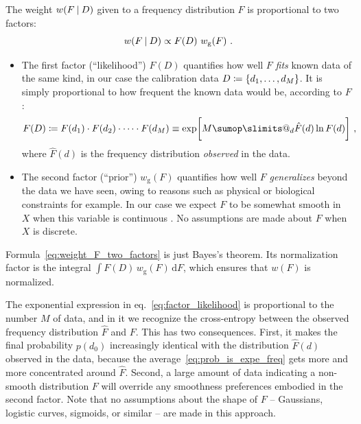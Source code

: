\documentclass[\ifafour a4paper,12pt,\else a5paper,10pt,\fi%
onecolumn,oneside,article,%
british%
]{memoir}
\makeatletter
\theoremstyle{remark}
\theoremstyle{innote}
\def\sum{\DOTSI\sumop\slimits@}
\newcommand*{\wrench}{{\fontencoding{U}\fontfamily{fontawesomethree}\selectfont\symbol{114}}}
\newcommand{\mynotew}[1]{{\footnotesize\color{notecolour}\wrench\ #1}}
\newcommand*{\di}{\mathrm{d}}%
\newcommand*{\defd}{\coloneqq}
\DeclarePairedDelimiter\set{\{}{\}} %
\renewcommand*{\|}[1][]{\nonscript\:#1\vert\nonscript\:\mathopen{}}
\newcommand*{\eqn}{eq.}%
\newcommand*{\wf}{w}
\newcommand*{\wfo}{w_{\textrm{g}}}
\makeatother
\begin{document}
The weight $\wf(F \| D)$ given to a frequency distribution $F$ is proportional to two factors:
\begin{equation}
  \label{eq:weight_F_two_factors}
  \wf(F \| D) \propto F(D)\ \wfo(F) \ .
\end{equation}
\begin{itemize}
  \item The first factor (\enquote{likelihood}) $F(D)$ quantifies how well $F$ \emph{fits} known data of the same kind, in our case the calibration data $D \defd \set{d_{1}, \dotsc, d_{M}}$. It is simply proportional to how frequent the known data would be, according to $F$:
  \begin{equation}
    \label{eq:factor_likelihood}
    F(D) \defd F(d_{1})\cdot F(d_{2})\cdot \dotsm\cdot F(d_{M})
    \equiv \exp\biggl[M \sum_{d} \hat{F}(d) \ln F(d)\biggr] \ ,
  \end{equation}
where $\hat{F}(d)$ is the frequency distribution \emph{observed} in the data.
  
\item The second factor (\enquote{prior}) $\wfo(F)$ quantifies how well $F$ \emph{generalizes} beyond the data we have seen, owing to reasons such as physical or biological constraints for example. In our case we expect $F$ to be somewhat smooth in $X$ when this variable is continuous \autocites[Cf.][]{goodetal1971}. No assumptions are made about $F$ when $X$ is discrete.
\end{itemize}
Formula~\eqref{eq:weight_F_two_factors} is just Bayes's theorem. Its normalization factor is the integral $\int F(D)\, \wfo(F)\, \di F$, which ensures that $\wf(F)$ is normalized.

The exponential expression in \eqn~\eqref{eq:factor_likelihood} is proportional to the number $M$ of data, and in it we recognize the cross-entropy between the observed frequency distribution $\hat{F}$ and $F$. This has two consequences. First, it makes the final probability $p(d_{0})$ increasingly identical with the distribution $\hat{F}(d)$ observed in the data, because the average~\eqref{eq:prob_is_expe_freq} gets more and more concentrated around $\hat{F}$. Second, a large amount of data indicating a non-smooth distribution $F$ will override any smoothness preferences embodied in the second factor. Note that no assumptions about the shape of $F$ -- Gaussians, logistic curves, sigmoids, or similar -- are made in this approach.
\end{document}
